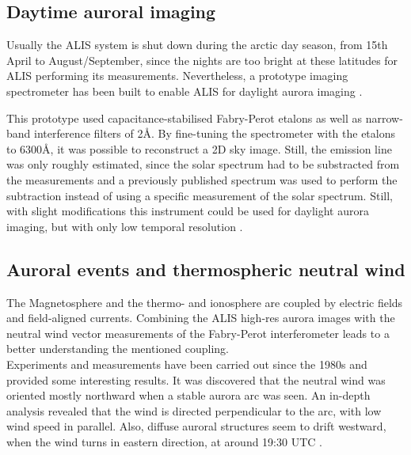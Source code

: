 \subsection{Daytime auroral imaging}
Usually the ALIS system is shut down during the arctic day season, from 15th April to August/September, since the nights are too bright at these latitudes for ALIS performing its measurements. Nevertheless, a prototype imaging spectrometer has been built to enable ALIS for daylight aurora imaging \citep{brandstrom2003auroral}.

This prototype used capacitance-stabilised Fabry-Perot etalons as well as narrow-band interference filters of 2Å. By fine-tuning the spectrometer with the etalons to 6300Å, it was possible to reconstruct a 2D sky image. Still, the emission line was only roughly estimated, since the solar spectrum had to be substracted from the measurements and a previously published spectrum was used to perform the subtraction instead of using a specific measurement of the solar spectrum. Still, with slight modifications this instrument could be used for daylight aurora imaging, but with only low temporal resolution \citep{brandstrom2003auroral}.

\subsection{Auroral events and thermospheric neutral wind}
The Magnetosphere and the thermo- and ionosphere are coupled by electric fields and field-aligned currents.
Combining the ALIS high-res aurora images with the neutral wind vector measurements of the Fabry-Perot interferometer leads to a better understanding the mentioned coupling.\\
Experiments and measurements have been carried out since the 1980s and provided some interesting results. It was discovered that the neutral wind was oriented mostly northward when a stable aurora arc was seen. An in-depth analysis revealed that the wind is directed perpendicular to the arc, with low wind speed in parallel. Also, diffuse auroral structures seem to drift westward, when the wind turns in eastern direction, at around 19:30 UTC \citep{brandstrom2003auroral}.


